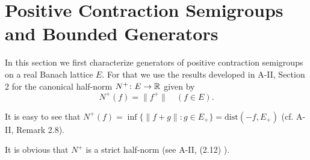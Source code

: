 \section{Positive Contraction Semigroups and Bounded Generators}\label{sec:c2-1}%
In this section we first characterize generators of positive contraction semigroups on a real Banach lattice $E$.
For that we use the results developed in A-II, Section 2 for the canonical half-norm $N^{+} \colon E \to \mathbb{R}$ given by
\begin{equation}\label{eq:c2-1.1}
N^{+}(f) = \|f^{+}\| \quad (f \in E).
\end{equation}
\begin{remark*}\label{rem:c2-1.1}
%
%
It is easy to see that $N^{+}(f) = \inf \{\|f+g\| \colon g \in E_{+}\} = \text{dist}(-f,E_{+})$ (cf. A-II, Remark 2.8). 
\end{remark*}
It is obvious that $N^{+}$ is a strict half-norm (see A-II, (2.12) ). 

